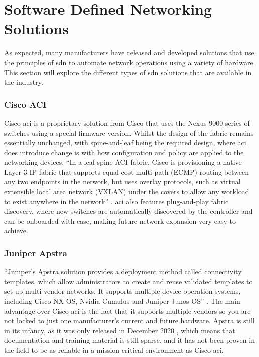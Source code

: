 \section{Software Defined Networking Solutions}
\label{litreview:types}
As expected, many manufacturers have released and developed solutions that use the principles of \gls{sdn} to automate network operations using a variety of hardware. This section will explore the different types of \gls{sdn} solutions that are available in the industry.

\subsubsection{Cisco ACI}
Cisco \gls{aci} is a proprietary solution from Cisco that uses the Nexus 9000 series of switches using a special firmware version. Whilst the design of the fabric remains essentially unchanged, with spine-and-leaf being the required design, where \gls{aci} does introduce change is with how configuration and policy are applied to the networking devices. ``In a leaf-spine ACI fabric, Cisco is provisioning a native Layer 3 IP fabric that supports equal-cost multi-path (ECMP) routing between any two endpoints in the network, but uses overlay protocols, such as virtual extensible local area network (VXLAN) under the covers to allow any workload to exist anywhere in the network'' \citep{duffy2014cisco}. \gls{aci} also features plug-and-play fabric discovery, where new switches are automatically discovered by the controller and can be onboarded with ease, making future network expansion very easy to achieve.

\subsubsection{Juniper Apstra}
``Juniper’s Apstra solution provides
a deployment method called connectivity templates, which allow administrators to create and reuse validated templates to set up multi-vendor networks. It supports multiple device operation systems, including Cisco NX-OS, Nvidia Cumulus and Juniper Junos OS'' \citep{9914530}. The main advantage over Cisco \gls{aci} is the fact that it supports multiple vendors so you are not locked to just one manufacturer's current and future hardware. Apstra is still in its infancy, as it was only released in December 2020 \citep{9914530}, which means that documentation and training material is still sparse, and it has not been proven in the field to be as reliable in a mission-critical environment as Cisco \gls{aci}.

